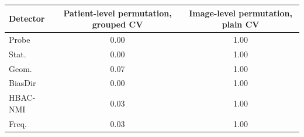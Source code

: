 \begin{tabular}{lcc}
\toprule
Detector & Patient-level permutation, grouped CV & Image-level permutation, plain CV \\
\midrule
Probe & 0.00 & 1.00 \\
Stat. & 0.00 & 1.00 \\
Geom. & 0.07 & 1.00 \\
BiasDir & 0.00 & 1.00 \\
HBAC-NMI & 0.03 & 1.00 \\
Freq. & 0.03 & 1.00 \\
\bottomrule
\end{tabular}
